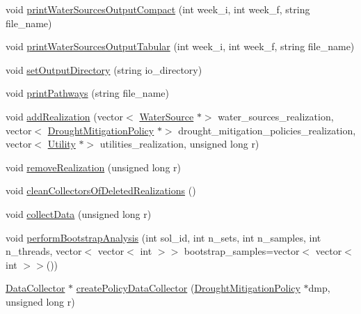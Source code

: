 \begin{DoxyCompactItemize}
\item 
void \mbox{\hyperlink{classMasterDataCollector_adbe50e49689078e64a28450087ad0961_adbe50e49689078e64a28450087ad0961}{print\+Water\+Sources\+Output\+Compact}} (int week\+\_\+i, int week\+\_\+f, string file\+\_\+name)
\item 
void \mbox{\hyperlink{classMasterDataCollector_a77dd707b686d936118cd4e940156754f_a77dd707b686d936118cd4e940156754f}{print\+Water\+Sources\+Output\+Tabular}} (int week\+\_\+i, int week\+\_\+f, string file\+\_\+name)
\item 
void \mbox{\hyperlink{classMasterDataCollector_a6ef49bd511d89217e9a5b0626b3499c4_a6ef49bd511d89217e9a5b0626b3499c4}{set\+Output\+Directory}} (string io\+\_\+directory)
\item 
void \mbox{\hyperlink{classMasterDataCollector_a966681d5219d11d0c6882522cd2ddd20_a966681d5219d11d0c6882522cd2ddd20}{print\+Pathways}} (string file\+\_\+name)
\item 
void \mbox{\hyperlink{classMasterDataCollector_aadb319947e62055428b18339d559a0ef_aadb319947e62055428b18339d559a0ef}{add\+Realization}} (vector$<$ \mbox{\hyperlink{classWaterSource}{Water\+Source}} $\ast$$>$ water\+\_\+sources\+\_\+realization, vector$<$ \mbox{\hyperlink{classDroughtMitigationPolicy}{Drought\+Mitigation\+Policy}} $\ast$$>$ drought\+\_\+mitigation\+\_\+policies\+\_\+realization, vector$<$ \mbox{\hyperlink{classUtility}{Utility}} $\ast$$>$ utilities\+\_\+realization, unsigned long r)
\item 
void \mbox{\hyperlink{classMasterDataCollector_a5cbae3837d5f32ea3469a55f025692f5_a5cbae3837d5f32ea3469a55f025692f5}{remove\+Realization}} (unsigned long r)
\item 
void \mbox{\hyperlink{classMasterDataCollector_a92683f7c5ec82e45259fe403be285149_a92683f7c5ec82e45259fe403be285149}{clean\+Collectors\+Of\+Deleted\+Realizations}} ()
\item 
void \mbox{\hyperlink{classMasterDataCollector_a522fd42f6cf612e32691cf11a807045c_a522fd42f6cf612e32691cf11a807045c}{collect\+Data}} (unsigned long r)
\item 
void \mbox{\hyperlink{classMasterDataCollector_acbf0e8a8f30e483e504d756883d45cf0_acbf0e8a8f30e483e504d756883d45cf0}{perform\+Bootstrap\+Analysis}} (int sol\+\_\+id, int n\+\_\+sets, int n\+\_\+samples, int n\+\_\+threads, vector$<$ vector$<$ int $>$$>$ bootstrap\+\_\+samples=vector$<$ vector$<$ int $>$$>$())
\item 
\mbox{\hyperlink{classDataCollector}{Data\+Collector}} $\ast$ \mbox{\hyperlink{classMasterDataCollector_a0b1606181cad15c58918deef52618885_a0b1606181cad15c58918deef52618885}{create\+Policy\+Data\+Collector}} (\mbox{\hyperlink{classDroughtMitigationPolicy}{Drought\+Mitigation\+Policy}} $\ast$dmp, unsigned long r)
$$
\end{DoxyCompactItemize}

